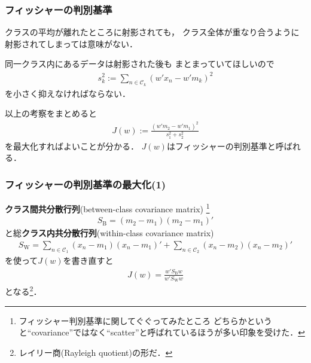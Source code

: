 \documentclass[10pt,%
hyperref={unicode}]{beamer}
\begin{document}
\begin{frame}
    \frametitle{フィッシャーの判別基準}
    クラスの平均が離れたところに射影されても，
    クラス全体が重なり合うように射影されてしまっては意味がない．

    \bigskip

    同一クラス内にあるデータは射影された後も
    まとまっていてほしいので
    \begin{align}
        s_k^2 := \sum_{n \in \mathcal{C}_k}(w'x_n - w'm_k)^2 \tag{4.24}
    \end{align}
    を小さく抑えなければならない．

    \bigskip

    以上の考察をまとめると
    \begin{align}
        J(w) := \frac{(w'm_2 - w'm_1)^2}{s_1^2 + s_2^2} \tag{4.25}
    \end{align}
    を最大化すればよいことが分かる．
    $J(w)$はフィッシャーの判別基準と呼ばれる．
\end{frame}

\begin{frame}
    \frametitle{フィッシャーの判別基準の最大化(1)}
    \textbf{クラス間共分散行列}(between-class covariance matrix)
    \footnote{フィッシャー判別基準に関してぐぐってみたところ
    どちらかというと“covariance”ではなく“scatter”と呼ばれているほうが多い印象を受けた．}
    \begin{align}
        S_\mathrm{B} = (m_2 - m_1)(m_2 - m_1)' \tag{4.27}
    \end{align}
    と総\textbf{クラス内共分散行列}(within-class covariance matrix)
    \begin{align}
        S_\mathrm{W} = \sum_{n \in \mathcal{C}_1} (x_n - m_1)(x_n - m_1)' +
        \sum_{n \in \mathcal{C}_2} (x_n - m_2)(x_n - m_2)' \tag{4.28}
    \end{align}
    を使って$J(w)$を書き直すと
    \begin{align}
        J(w) = \frac{w'S_\mathrm{B}w}{w'S_\mathrm{W}w} \tag{4.26}
    \end{align}
    となる\footnote{レイリー商(Rayleigh quotient)の形だ．}．
\end{frame}
\end{document}
